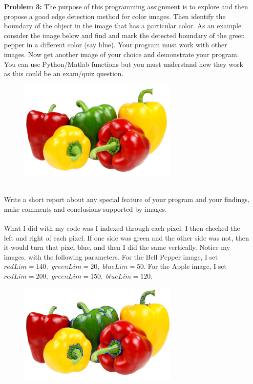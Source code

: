 \documentclass[11pt]{article}
\newenvironment{problem}[1]{\textbf{Problem #1: }}{\newpage}
\begin{document}
	\begin{problem}{3}
		The purpose of this programming assignment is to explore and then propose a good edge detection method for color images. Then identify the boundary of the object in the image that has a particular color. As an example consider the image below and find and mark the detected boundary of  the green pepper in a different color (say blue). Your program must work with other images. Now get another image of your choice and demonstrate your program. You can use Python/Matlab functions but you must understand how they work as this could be an exam/quiz question. 
		\begin{figure}[h!]
			\centering
			\includegraphics[width = 8cm]{Images/BellPepper3}
		\end{figure}
		\\
		Write a short report about any special feature of your program and  your findings, make comments and conclusions supported by images.
		\\ \\
		What I did with my code was I indexed through each pixel.  I then checked the left and right of each pixel.  If one side was green and the other side was not, then it would turn that pixel blue, and then I did the same vertically. Notice my images, with the following parameters.  For the Bell Pepper image, I set $redLim = 140, \,\,greenLim = 20,\,\, blueLim = 50$. For the Apple image, I set $redLim = 200,\,\, greenLim = 150,\,\, blueLim = 120$. 
		\begin{figure}[h!]
			\centering
			\includegraphics[width = 8cm]{Images/BellBlue}

\end{figure}
\end{problem}
\end{document}
